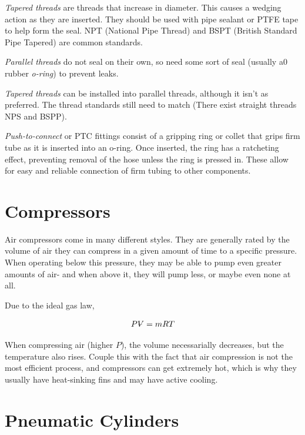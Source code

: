 \begin{asparaenum}[a)]
	\item  \textit{Tapered threads} are threads that increase in diameter. This causes a wedging action as they are inserted. They should be used with pipe sealant or PTFE tape to help form the seal. NPT (National Pipe Thread) and BSPT (British Standard Pipe Tapered) are common standards.
	\item \textit{Parallel threads} do not seal on their own, so need some sort of seal (usually a0 rubber \textit{o-ring}) to prevent leaks.
	\item \textit{Tapered threads} can be installed into parallel threads, although it isn't as preferred. The thread standards still need to match (There exist straight threads NPS and BSPP).
	\item \textit{Push-to-connect} or PTC fittings consist of a gripping ring or collet that grips firm tube as it is inserted into an o-ring. Once inserted, the ring has a ratcheting effect, preventing removal of the hose unless the ring is pressed in. These allow for easy and reliable connection of firm tubing to other components.	
\end{asparaenum}

\section{Compressors}
Air compressors come in many different styles. They are generally rated by the volume of air they can compress in a given amount of time to a specific pressure. When operating below this pressure, they may be able to pump even greater amounts of air- and when above it, they will pump less, or maybe even none at all.

Due to the ideal gas law,

\begin{align}
	P \volume = m R T
\end{align}

When compressing air (higher $P$), the volume necessarially decreases, but the temperature also rises. Couple this with the fact that air compression is not the most efficient process, and compressors can get extremely hot, which is why they usually have heat-sinking fins and may have active cooling.

\section{Pneumatic Cylinders}

